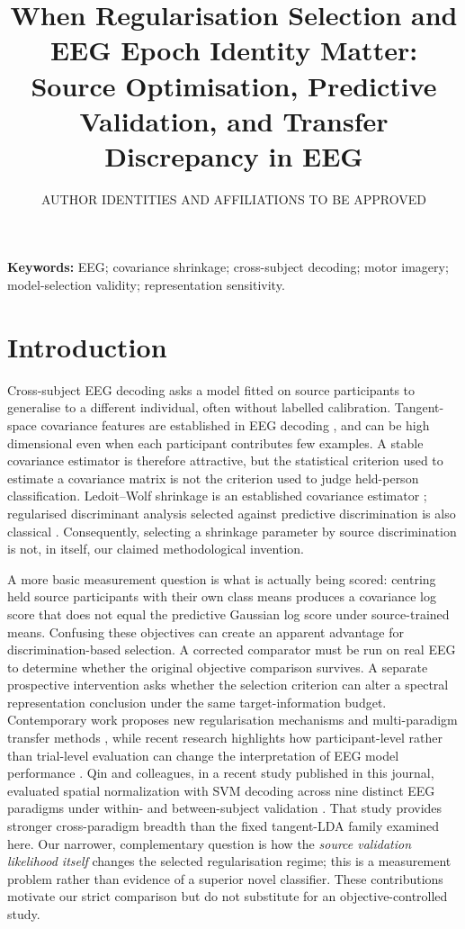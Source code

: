 \documentclass[11pt,a4paper]{article}
\title{When Regularisation Selection and EEG Epoch Identity Matter:\\
Source Optimisation, Predictive Validation, and Transfer Discrepancy in EEG}
\author{AUTHOR IDENTITIES AND AFFILIATIONS TO BE APPROVED}
\date{}
\begin{document}
\maketitle

\noindent\textbf{Keywords:} EEG; covariance shrinkage; cross-subject decoding;
motor imagery; model-selection validity; representation sensitivity.

\section{Introduction}
Cross-subject EEG decoding asks a model fitted on source participants to
generalise to a different individual, often without labelled calibration.
Tangent-space covariance features are established in EEG decoding
\cite{barachant2012riemannian}, and can be high dimensional even
when each participant contributes few examples. A stable covariance estimator is therefore
attractive, but the statistical criterion used to estimate a covariance
matrix is not the criterion used to judge held-person classification.
Ledoit--Wolf shrinkage is an established covariance estimator
\cite{ledoit2004}; regularised discriminant analysis selected against
predictive discrimination is also classical \cite{friedman1989}.
Consequently, selecting a shrinkage parameter by source discrimination
is not, in itself, our claimed methodological invention.

A more basic measurement question is what is actually being scored:
centring held source participants with their own class means produces a
covariance log score that does not equal the predictive Gaussian log score
under source-trained means. Confusing these objectives can create an
apparent advantage for discrimination-based selection. A corrected
comparator must be run on real EEG to determine whether the original
objective comparison survives. A separate prospective intervention asks
whether the selection criterion can alter a spectral representation
conclusion under the same target-information budget. Contemporary work proposes
new regularisation mechanisms and multi-paradigm transfer methods
\cite{miao2025freezing,morvay2026wbt,he2026cyclic}, while recent research highlights
how participant-level rather than trial-level evaluation can change the
interpretation of EEG model performance \cite{gil2026subjectvalidation}.
Qin and colleagues, in a recent study published in this journal,
evaluated spatial normalization with SVM decoding across nine
distinct EEG paradigms under within- and between-subject validation
\cite{qin2026spatialnorm}. That study provides stronger
cross-paradigm breadth than the fixed tangent-LDA family examined here.
Our narrower, complementary question is how the \emph{source
validation likelihood itself} changes the selected
regularisation regime; this is a measurement problem rather
than evidence of a superior novel classifier.
These contributions motivate our strict comparison but do not substitute
for an objective-controlled study.
\end{document}
